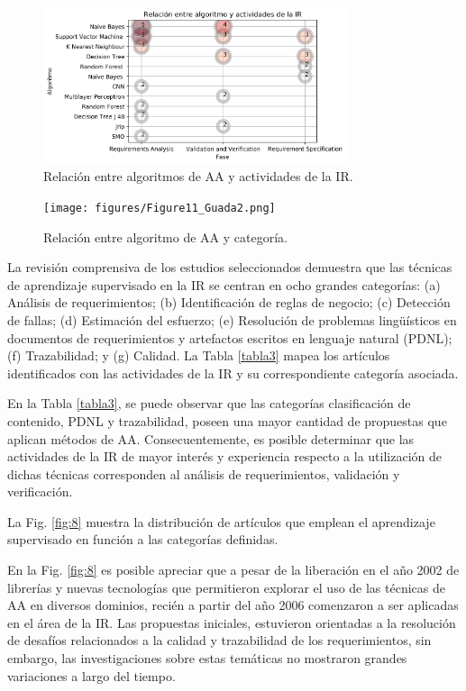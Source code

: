 \documentclass[journal]{IEEEtran}
\begin{document}
\begin{figure}[!t]
\centering
\includegraphics[width=3.5in]{figures/figure9_Guada.png}
\caption{Relación entre algoritmos de AA y actividades de la IR.}
\label{fig:9}
\end{figure}

\begin{figure}[!t]
\centering
\texttt{[image: figures/Figure11\_Guada2.png]}
\caption{Relación entre algoritmo de AA y categoría.}
\label{fig:10}
\end{figure}


La revisión comprensiva de los estudios seleccionados demuestra que las técnicas de aprendizaje supervisado en la IR se centran en ocho grandes categorías: (a) Análisis de requerimientos; (b) Identificación de reglas de negocio; (c) Detección de fallas; (d) Estimación del esfuerzo; (e) Resolución de problemas lingüísticos en documentos de requerimientos y artefactos escritos en lenguaje natural (PDNL); (f) Trazabilidad; y (g) Calidad. La Tabla \ref{tabla3} mapea los artículos identificados con las actividades de la IR y su correspondiente categoría asociada. 

En la Tabla \ref{tabla3}, se puede observar que las categorías clasificación de contenido, PDNL y trazabilidad, poseen una mayor cantidad de propuestas que aplican métodos de AA. Consecuentemente, es posible determinar que las actividades de la IR de mayor interés y experiencia respecto a la utilización de dichas técnicas corresponden al análisis de requerimientos, validación y verificación. 

La Fig. \ref{fig:8} muestra la distribución de artículos que emplean el aprendizaje supervisado en función a las categorías definidas.

En la Fig. \ref{fig:8} es posible apreciar que a pesar de la liberación en el año 2002 de librerías y nuevas tecnologías que permitieron explorar el uso de las técnicas de AA en diversos dominios, recién a partir del año 2006 comenzaron a ser aplicadas en el área de la IR. Las propuestas iniciales, estuvieron orientadas a la resolución de desafíos relacionados a la calidad y trazabilidad de los requerimientos, sin embargo, las investigaciones sobre estas temáticas no mostraron grandes variaciones a largo del tiempo. 
\end{document}
